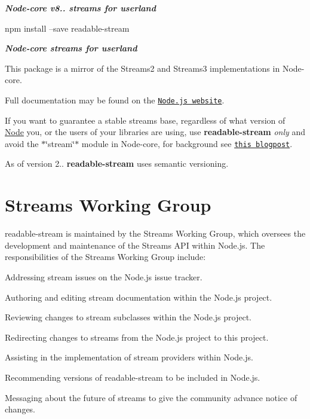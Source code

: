 {\itshape {\bfseries Node-\/core v8.. streams for userland}} \href{https://travis-ci.org/nodejs/readable-stream}{\tt }

\href{https://nodei.co/npm/readable-stream/}{\tt } \href{https://nodei.co/npm/readable-stream/}{\tt }

\href{https://saucelabs.com/u/readable-stream}{\tt }


\begin{DoxyCode}
npm install --save readable-stream
\end{DoxyCode}


{\itshape {\bfseries Node-\/core streams for userland}}

This package is a mirror of the Streams2 and Streams3 implementations in Node-\/core.

Full documentation may be found on the \href{https://nodejs.org/dist/v8.11.1/docs/api/stream.html}{\tt Node.\+js website}.

If you want to guarantee a stable streams base, regardless of what version of \mbox{\hyperlink{classNode}{Node}} you, or the users of your libraries are using, use {\bfseries readable-\/stream} {\itshape only} and avoid the $\ast$\char`\"{}stream\char`\"{}$\ast$ module in Node-\/core, for background see \href{http://r.va.gg/2014/06/why-i-dont-use-nodes-core-stream-module.html}{\tt this blogpost}.

As of version 2.. {\bfseries readable-\/stream} uses semantic versioning.

\section*{Streams Working Group}

{\ttfamily readable-\/stream} is maintained by the Streams Working Group, which oversees the development and maintenance of the Streams A\+PI within Node.\+js. The responsibilities of the Streams Working Group include\+:


\begin{DoxyItemize}
\item Addressing stream issues on the Node.\+js issue tracker.
\item Authoring and editing stream documentation within the Node.\+js project.
\item Reviewing changes to stream subclasses within the Node.\+js project.
\item Redirecting changes to streams from the Node.\+js project to this project.
\item Assisting in the implementation of stream providers within Node.\+js.
\item Recommending versions of {\ttfamily readable-\/stream} to be included in Node.\+js.
\item Messaging about the future of streams to give the community advance notice of changes.
\end{DoxyItemize}


